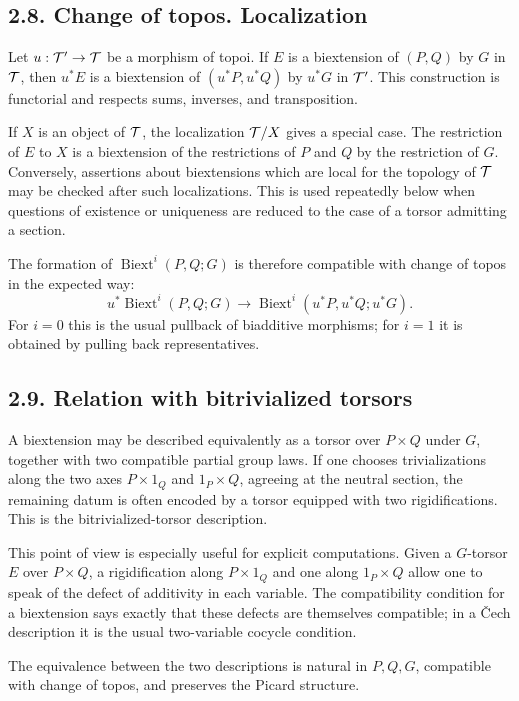 \documentclass[11pt]{article}
\theoremstyle{plain}
\theoremstyle{definition}
\theoremstyle{remark}
\DeclareMathOperator{\Biext}{Biext}
\begin{document}
\subsection*{2.8. Change of topos. Localization}

Let \(u:\mathcal T'\to\mathcal T\) be a morphism of topoi. If \(E\) is a biextension of
\((P,Q)\) by \(G\) in \(\mathcal T\), then \(u^*E\) is a biextension of
\((u^*P,u^*Q)\) by \(u^*G\) in \(\mathcal T'\). This construction is functorial and
respects sums, inverses, and transposition.

If \(X\) is an object of \(\mathcal T\), the localization \(\mathcal T/X\) gives a special
case. The restriction of \(E\) to \(X\) is a biextension of the restrictions of
\(P\) and \(Q\) by the restriction of \(G\). Conversely, assertions about
biextensions which are local for the topology of \(\mathcal T\) may be checked after
such localizations. This is used repeatedly below when questions of existence or
uniqueness are reduced to the case of a torsor admitting a section.

The formation of \(\Biext^i(P,Q;G)\) is therefore compatible with change of
topos in the expected way:
\[
u^*\Biext^i(P,Q;G)\longrightarrow
\Biext^i(u^*P,u^*Q;u^*G).
\]
For \(i=0\) this is the usual pullback of biadditive morphisms; for \(i=1\) it is
obtained by pulling back representatives.

\subsection*{2.9. Relation with bitrivialized torsors}

A biextension may be described equivalently as a torsor over \(P\times Q\) under
\(G\), together with two compatible partial group laws. If one chooses
trivializations along the two axes \(P\times 1_Q\) and \(1_P\times Q\), agreeing
at the neutral section, the remaining datum is often encoded by a torsor equipped
with two rigidifications. This is the bitrivialized-torsor description.

This point of view is especially useful for explicit computations. Given a
\(G\)-torsor \(E\) over \(P\times Q\), a rigidification along \(P\times 1_Q\)
and one along \(1_P\times Q\) allow one to speak of the defect of additivity in
each variable. The compatibility condition for a biextension says exactly that
these defects are themselves compatible; in a Čech description it is the usual
two-variable cocycle condition.

The equivalence between the two descriptions is natural in \(P,Q,G\), compatible
with change of topos, and preserves the Picard structure.
\end{document}

